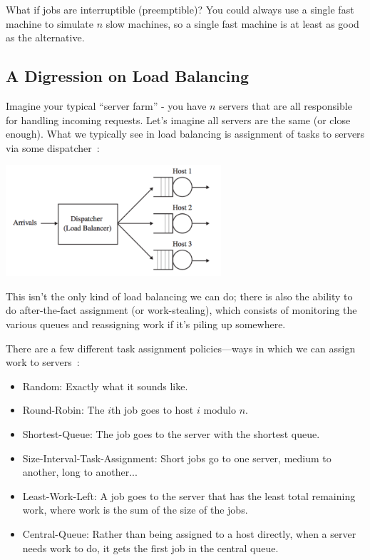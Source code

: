 \documentclass[a4paper]{report}
\begin{document}
What if jobs are interruptible (preemptible)? You could always use a single fast machine to simulate $n$ slow machines, so a single fast machine is at least as good as the alternative. 

\subsection*{A Digression on Load Balancing}

Imagine your typical ``server farm'' - you have $n$ servers that are all responsible for handling incoming requests. Let's imagine all servers are the same (or close enough). What we typically see in load balancing is assignment of tasks to servers via some dispatcher~\cite{pmd}:

\begin{center}
	\includegraphics[width=0.6\textwidth]{images/central-dispatcher.png}
\end{center}

This isn't the only kind of load balancing we can do; there is also the ability to do after-the-fact assignment (or work-stealing), which consists of monitoring the various queues and reassigning work if it's piling up somewhere.

There are a few different task assignment policies---ways in which we can assign work to servers~\cite{pmd}:

\begin{itemize}
	\item Random: Exactly what it sounds like.
	\item Round-Robin: The $i$th job goes to host $i$ modulo $n$.
	\item Shortest-Queue: The job goes to the server with the shortest queue.
	\item Size-Interval-Task-Assignment: Short jobs go to one server, medium to another, long to another...
	\item Least-Work-Left: A job goes to the server that has the least total remaining work, where work is the sum of the size of the jobs.
	\item Central-Queue: Rather than being assigned to a host directly, when a server needs work to do, it gets the first job in the central queue.
\end{itemize}
\end{document}

